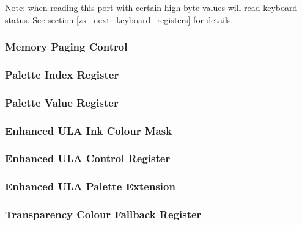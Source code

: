 Note: when reading this port with certain high byte values will read keyboard status. See section \ref{zx_next_keyboard_registers} for details.


\subsubsection{Memory Paging Control }


\subsubsection{Palette Index Register }
\vspace*{-2ex}
\subsubsection{Palette Value Register }
\vspace*{-2ex}
\subsubsection{Enhanced ULA Ink Colour Mask }
\vspace*{-2ex}
\subsubsection{Enhanced ULA Control Register }
\vspace*{-2ex}
\subsubsection{Enhanced ULA Palette Extension }
\vspace*{-2ex}
\subsubsection{Transparency Colour Fallback Register }



\pagebreak
\IntentionallyEmpty
\pagebreak
